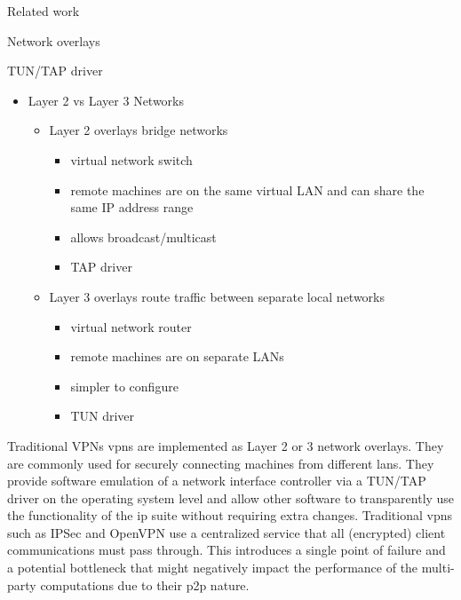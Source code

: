 \begin{frame}[fragile]{Related work}
\begin{block}{Network overlays}
\protect\hypertarget{network-overlays}{}
\begin{block}{TUN/TAP driver}
\protect\hypertarget{tuntap-driver}{}
\begin{itemize}
\tightlist
\item
  Layer 2 vs Layer 3 Networks

  \begin{itemize}
  \tightlist
  \item
    Layer 2 overlays bridge networks

    \begin{itemize}
    \tightlist
    \item
      virtual network switch
    \item
      remote machines are on the same virtual LAN and can share the same
      IP address range
    \item
      allows broadcast/multicast
    \item
      TAP driver
    \end{itemize}
  \item
    Layer 3 overlays route traffic between separate local networks

    \begin{itemize}
    \tightlist
    \item
      virtual network router
    \item
      remote machines are on separate LANs
    \item
      simpler to configure
    \item
      TUN driver
    \end{itemize}
  \end{itemize}
\end{itemize}
\end{block}

\begin{block}{Traditional VPNs}
\protect\hypertarget{traditional-vpns}{}
\glspl{vpn} are implemented as Layer 2 or 3 network overlays. They are
commonly used for securely connecting machines from different
\glspl{lan}. They provide software emulation of a network interface
controller via a TUN/TAP driver on the operating system level and allow
other software to transparently use the functionality of the \gls{ip}
suite without requiring extra changes. Traditional \glspl{vpn} such as
IPSec\autocite{ipSecDocs} and OpenVPN\autocite{openVPNDocs} use a
centralized service that all (encrypted) client communications must pass
through. This introduces a single point of failure and a potential
bottleneck that might negatively impact the performance of the
multi-party computations due to their \gls{p2p} nature.
\end{block}


\end{block}
\end{frame}
